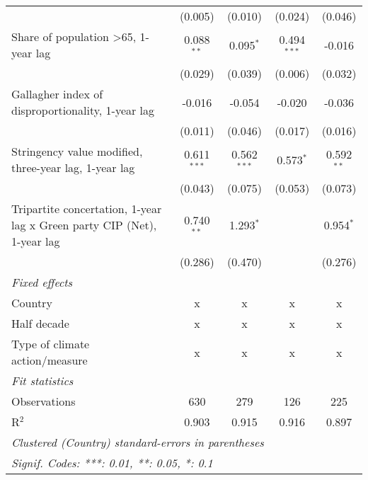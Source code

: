 \begin{table}[htbp]
\begin{tabular}{lcccc}
                                                                              & (0.005)        & (0.010)         & (0.024)         & (0.046)\\   
      Share of population >65, 1-year lag                                     & 0.088$^{**}$   & 0.095$^{*}$     & 0.494$^{***}$   & -0.016\\   
                                                                              & (0.029)        & (0.039)         & (0.006)         & (0.032)\\   
      Gallagher index of disproportionality, 1-year lag                       & -0.016         & -0.054          & -0.020          & -0.036\\   
                                                                              & (0.011)        & (0.046)         & (0.017)         & (0.016)\\   
      Stringency value modified, three-year lag, 1-year lag                   & 0.611$^{***}$  & 0.562$^{***}$   & 0.573$^{*}$     & 0.592$^{**}$\\   
                                                                              & (0.043)        & (0.075)         & (0.053)         & (0.073)\\   
      Tripartite concertation, 1-year lag x Green party CIP (Net), 1-year lag & 0.740$^{**}$   & 1.293$^{*}$     &                 & 0.954$^{*}$\\   
                                                                              & (0.286)        & (0.470)         &                 & (0.276)\\   
      \emph{Fixed effects}\\
      Country                                                                 & x              & x               & x               & x\\  
      Half decade                                                             & x              & x               & x               & x\\  
      Type of climate action/measure                                          & x              & x               & x               & x\\  
      \midrule \emph{Fit statistics}\\
      Observations                                                            & 630            & 279             & 126             & 225\\  
      R$^2$                                                                   & 0.903          & 0.915           & 0.916           & 0.897\\  
      \midrule
      \multicolumn{5}{l}{\emph{Clustered (Country) standard-errors in parentheses}}\\
      \multicolumn{5}{l}{\emph{Signif. Codes: ***: 0.01, **: 0.05, *: 0.1}}\\
   \end{tabular}
\end{table}


